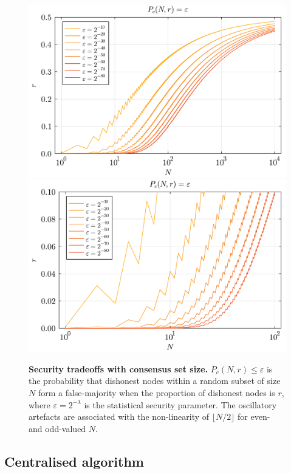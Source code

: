 \begin{figure}
	\includegraphics[width=\columnwidth]{figures/majority_prob.pdf}\\
	\includegraphics[width=\columnwidth]{figures/majority_prob_zoom.pdf}
	\caption{\textbf{Security tradeoffs with consensus set size.} $P_c(N,r)\leq\varepsilon$ is the probability that dishonest nodes within a random subset of size $N$ form a false-majority when the proportion of dishonest nodes is $r$, where $\varepsilon=2^{-\lambda}$ is the statistical security parameter. The oscillatory artefacts are associated with the non-linearity of \mbox{$\lfloor N/2\rfloor$} for even- and odd-valued $N$.} \label{fig:P_M}
\end{figure}

\subsection{Centralised algorithm}

